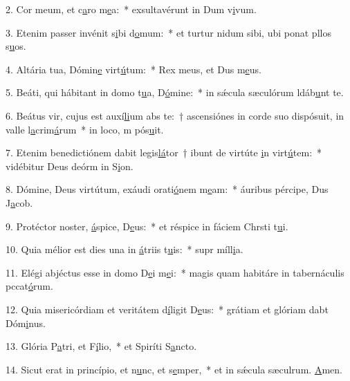 2. Cor meum, et c\uline{a}ro m\uline{e}a:~* exsultavérunt in Dum v\uline{i}vum.\par 
3. Etenim passer invénit s\uline{i}bi d\uline{o}mum:~* et turtur nidum sibi, ubi ponat pllos s\uline{u}os.\par 
4. Altária tua, Dómin\uline{e} virt\uline{ú}tum:~* Rex meus, et Dus m\uline{e}us.\par 
5. Beáti, qui hábitant in domo t\uline{u}a, D\uline{ó}mine:~* in sǽcula sæculórum ldáb\uline{u}nt te.\par 
6. Beátus vir, cujus est auxí\uline{li}um abs te:~† ascensiónes in corde suo dispósuit, in valle l\uline{a}crim\uline{á}rum~* in loco, m pós\uline{u}it.\par 
7. Etenim benedictiónem dabit legis\uline{lá}tor~† ibunt de virtúte \uline{i}n virt\uline{ú}tem:~* vidébitur Deus deórm in S\uline{i}on.\par 
8. Dómine, Deus virtútum, exáudi orati\uline{ó}nem m\uline{e}am:~* áuribus pércipe, Dus J\uline{a}cob.\par 
9. Protéctor noster, \uline{á}spice, D\uline{e}us:~* et réspice in fáciem Chrsti t\uline{u}i.\par 
10. Quia mélior est dies una in \uline{á}triis t\uline{u}is:~* supr míll\uline{i}a.\par 
11. Elégi abjéctus esse in domo D\uline{e}i m\uline{e}i:~* magis quam habitáre in tabernáculis pccat\uline{ó}rum.\par 
12. Quia misericórdiam et veritátem d\uline{í}ligit D\uline{e}us:~* grátiam et glóriam dabt Dóm\uline{i}nus.\par 
13. Glória P\uline{a}tri, et F\uline{í}lio,~* et Spiríti S\uline{a}ncto.\par 
14. Sicut erat in princípio, et n\uline{u}nc, et s\uline{e}mper,~* et in sǽcula sæculrum. \uline{A}men.\par 
